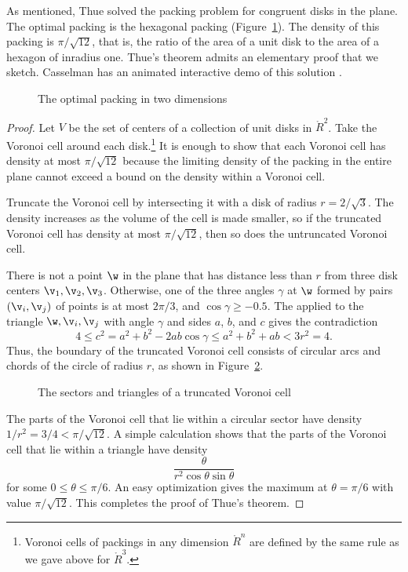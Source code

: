 As mentioned, Thue solved the packing problem for congruent disks in
the plane.  The optimal packing is the hexagonal packing
(Figure~\ref{fig:2D-hex}).  The density of this packing is
$\pi/\sqrt{12}$, that is, the ratio of the area of a unit disk to the area of a
hexagon of inradius one.  Thue's theorem admits an elementary proof that
we sketch.    Casselman has an animated interactive demo of this
solution \cite{casselman:pennies}.

\begin{figure}[htb]
  \centering
  \caption{The optimal packing in two dimensions}
  \label{fig:2D-hex}
\end{figure}

\begin{proof}
Let $V$ be the set of centers of a collection of unit disks in
$\ring{R}^2$.  Take the Voronoi cell around each
disk.\footnote{Voronoi cells of packings in any dimension $\ring{R}^n$
  are defined by the same rule as we gave above for $\ring{R}^3$.}   It
is enough to show that each Voronoi cell has density at most
$\pi/\sqrt{12}$ because the limiting density of the packing in the entire plane cannot exceed
a bound on the density within a Voronoi cell.  


Truncate the Voronoi cell by intersecting it with a disk of radius
$r=2/\sqrt3$.   The density increases as the volume of the cell is made smaller,
so if the truncated Voronoi cell
has density at most $\pi/\sqrt{12}$, then so does the untruncated Voronoi cell.

There is not a point $\w$ in the plane that has distance  less than $r$
from three disk centers $\v_1,\v_2,\v_3$.  Otherwise, one of the three
angles $\gamma$ at $\w$ formed by pairs $(\v_i,\v_j)$ of points
 is at most $2\pi/3$, and $\cos\gamma\ge -0.5$.
The  applied to the triangle $\w,\v_i,\v_j$ with angle
$\gamma$ and sides $a$, $b$, and $c$ gives the contradiction
   \[ 
   4 \le c^2 = a^2 + b^2 - 2 a b \cos\gamma 
   \le a^2 + b^2 + a b < 3r^2 = 4.
   \] 
Thus, the boundary of the truncated Voronoi cell consists of circular
arcs and chords of the circle of radius $r$, as shown in Figure~\ref{fig:2D-proof}.

\begin{figure}[htb]
  \centering
  \caption{The sectors and triangles of a truncated Voronoi cell}
  \label{fig:2D-proof}
\end{figure}

The parts of the Voronoi cell that lie within a circular sector have
density $1/r^2 = 3/4 < \pi/\sqrt{12}$.  A simple calculation shows
that the parts of the Voronoi cell that lie within a triangle have
density
   \begin{equation}\label{eqn:rog2d}
   \frac{\theta}{r^2 \cos\theta\sin\theta}
   \end{equation}
for some $0 \le \theta\le \pi/6$.  An easy optimization gives the maximum
at $\theta=\pi/6$ with value $\pi/\sqrt{12}$.  This completes the proof of Thue's theorem.
\end{proof}

